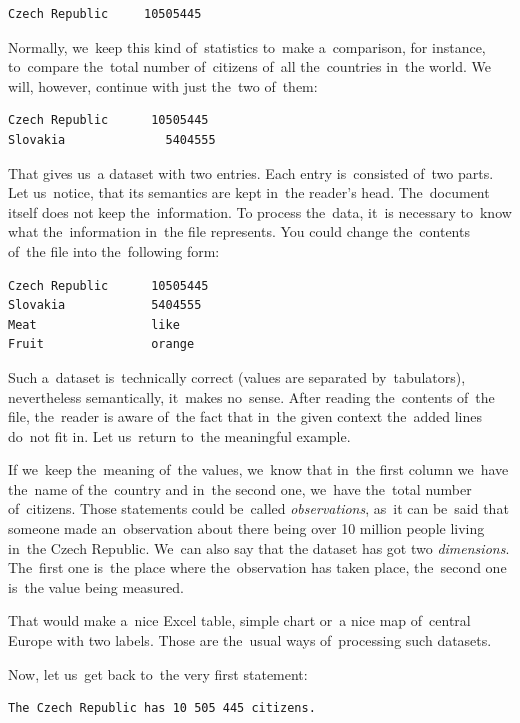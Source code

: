 \begin{verbatim}
Czech Republic     10505445
\end{verbatim}

Normally, we~keep this kind of~statistics to~make a~comparison, 
for instance, to~compare the~total number of~citizens of~all the~countries in~the world.
We will, however, continue with just the~two of~them:

\begin{verbatim}
Czech Republic	    10505445
Slovakia	          5404555
\end{verbatim}

That gives us~a dataset with two entries. Each entry is~consisted of~two parts. Let us~notice, that 
its semantics are kept in~the reader's head. The~document itself does not keep the~information.
To process the~data, it~is necessary to~know what the~information in~the file represents. You could change
the~contents of~the file into the~following form:

\begin{verbatim}
Czech Republic      10505445
Slovakia            5404555
Meat                like
Fruit               orange
\end{verbatim}

Such a~dataset is~technically correct (values are separated by~tabulators), nevertheless 
semantically, it~makes no~sense. After reading the~contents of~the file, the~reader 
is aware of~the fact that in~the given context the~added lines do~not fit in.
Let us~return to~the meaningful example.

If we~keep the~meaning of~the values, we~know that in~the first column we~have the~name
of the~country and in~the second one, we~have the~total number of~citizens. Those statements
could be~called \emph{observations}, as~it can be~said that someone made an~observation 
about there being over 10 million people living in~the Czech Republic. We~can also say that the
dataset has got two \emph{dimensions}. The~first one is~the place where the~observation has taken
place, the~second one is~the value being measured.

That would make a~nice Excel table, simple chart or~a nice map of~central Europe with
two labels. Those are the~usual ways of~processing such datasets.

Now, let us~get back to~the very first statement:

\begin{verbatim}
The Czech Republic has 10 505 445 citizens.
\end{verbatim}

